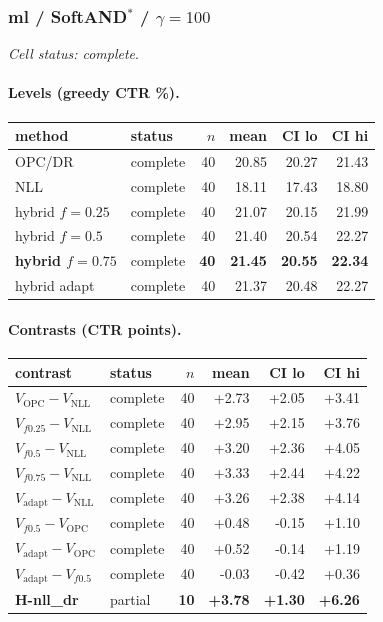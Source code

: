 \documentclass[10pt,a4paper]{article}
\begin{document}
\subsubsection{ml / SoftAND$^*$ / $\gamma=100$}
\emph{Cell status: complete}.
\paragraph{Levels (greedy CTR \%).}
{\centering\small\begin{tabular}{llrrrr}
\toprule method & status & $n$ & mean & CI lo & CI hi \\
\midrule
OPC/DR & complete & 40 & 20.85 & 20.27 & 21.43 \\
NLL & complete & 40 & 18.11 & 17.43 & 18.80 \\
hybrid $f{=}0.25$ & complete & 40 & 21.07 & 20.15 & 21.99 \\
hybrid $f{=}0.5$ & complete & 40 & 21.40 & 20.54 & 22.27 \\
\textbf{hybrid $f{=}0.75$} & complete & \textbf{40} & \textbf{21.45} & \textbf{20.55} & \textbf{22.34} \\
hybrid adapt & complete & 40 & 21.37 & 20.48 & 22.27 \\
\bottomrule\end{tabular}\par}
\paragraph{Contrasts (CTR points).}
{\centering\small\begin{tabular}{llrrrr}
\toprule contrast & status & $n$ & mean & CI lo & CI hi \\
\midrule
$V_{\mathrm{OPC}}-V_{\mathrm{NLL}}$ & complete & 40 & +2.73 & +2.05 & +3.41 \\
$V_{f0.25}-V_{\mathrm{NLL}}$ & complete & 40 & +2.95 & +2.15 & +3.76 \\
$V_{f0.5}-V_{\mathrm{NLL}}$ & complete & 40 & +3.20 & +2.36 & +4.05 \\
$V_{f0.75}-V_{\mathrm{NLL}}$ & complete & 40 & +3.33 & +2.44 & +4.22 \\
$V_{\mathrm{adapt}}-V_{\mathrm{NLL}}$ & complete & 40 & +3.26 & +2.38 & +4.14 \\
$V_{f0.5}-V_{\mathrm{OPC}}$ & complete & 40 & +0.48 & -0.15 & +1.10 \\
$V_{\mathrm{adapt}}-V_{\mathrm{OPC}}$ & complete & 40 & +0.52 & -0.14 & +1.19 \\
$V_{\mathrm{adapt}}-V_{f0.5}$ & complete & 40 & -0.03 & -0.42 & +0.36 \\
\textbf{H-nll\_dr} & partial & \textbf{10} & \textbf{+3.78} & \textbf{+1.30} & \textbf{+6.26} \\
\bottomrule\end{tabular}\par}
\end{document}
